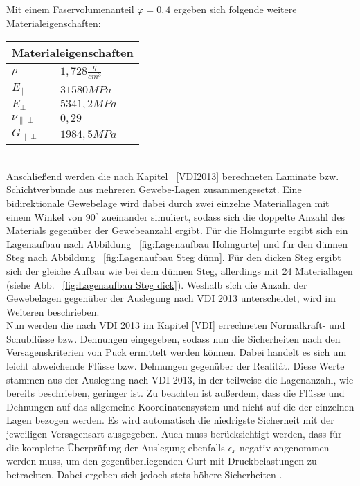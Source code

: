 \noindent Mit einem Faservolumenanteil $\varphi=0,4$ ergeben sich folgende weitere Materialeigenschaften:\\

\begin{tabular}{ll}
	\multicolumn{2}{c}{Materialeigenschaften}\\\hline\hline
	$\rho$ & $1,728 \frac{g}{cm^{3}}$ \\
	\hline
	$E_{\parallel}$ & $31580 MPa$\\
	\hline
	$E_{\perp}$ & $5341,2MPa$\\
	\hline
	$\nu_{\parallel\perp}$ & $0,29$\\
	\hline
	$G_{\parallel\perp}$ & $1984,5 MPa$\\
\end{tabular}\\

\noindent Anschließend werden die nach Kapitel ~\ref{VDI2013} berechneten Laminate bzw. Schichtverbunde aus mehreren Gewebe-Lagen zusammengesetzt. Eine bidirektionale Gewebelage wird dabei durch zwei einzelne Materiallagen mit einem Winkel von $90^{\circ}$ zueinander simuliert, sodass sich die doppelte Anzahl des Materials gegenüber der Gewebeanzahl ergibt. Für die Holmgurte ergibt sich ein Lagenaufbau nach Abbildung ~\ref{fig:Lagenaufbau Holmgurte} und für den dünnen Steg nach Abbildung ~\ref{fig:Lagenaufbau Steg dünn}. Für den dicken Steg ergibt sich der gleiche Aufbau wie bei dem dünnen Steg, allerdings mit 24 Materiallagen (siehe Abb. ~\ref{fig:Lagenaufbau Steg dick}). Weshalb sich die Anzahl der Gewebelagen gegenüber der Auslegung nach VDI 2013 unterscheidet, wird im Weiteren beschrieben.\\ 

\noindent Nun werden die nach VDI 2013 im Kapitel \ref{VDI} errechneten Normalkraft- und Schubflüsse bzw. Dehnungen eingegeben, sodass nun die Sicherheiten nach den Versagenskriterien von Puck ermittelt werden können. Dabei handelt es sich um leicht abweichende Flüsse bzw. Dehnungen gegenüber der Realität. Diese Werte stammen aus der Auslegung nach VDI 2013, in der teilweise die Lagenanzahl, wie bereits beschrieben, geringer ist. Zu beachten ist außerdem, dass die Flüsse und Dehnungen auf das allgemeine Koordinatensystem und nicht auf die der einzelnen Lagen bezogen werden. Es wird automatisch die niedrigste Sicherheit mit der jeweiligen Versagensart ausgegeben. Auch muss berücksichtigt werden, dass für die komplette Überprüfung der Auslegung ebenfalls $\epsilon_{x}$ negativ angenommen werden muss, um den gegenüberliegenden Gurt mit Druckbelastungen zu betrachten. Dabei ergeben sich jedoch stets höhere Sicherheiten \cite{item22}\cite{item3}.\\

